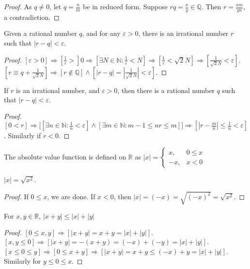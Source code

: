 \documentclass[crop=false,class=article,oneside]{standalone}
\begin{document}
    \begin{proof}
    As $q\ne 0$, let $q = \frac{n}{m}$ be in reduced form. Suppose $rq = \frac{x}{y}\in \mathbb{Q}$. Then $r=\frac{xm}{yn}$, a contradiction.
    \end{proof}
    \begin{theorem}
    Given a rational number $q$, and for any $\varepsilon>0$, there is an irrational number $r$ such that $|r-q|<\varepsilon$.
    \end{theorem}
    \begin{proof}
    $[\varepsilon>0]\Rightarrow [\frac{1}{\varepsilon}>]0\Rightarrow [\exists N\in \mathbb{N}:\frac{1}{\varepsilon}<N]\Rightarrow [\frac{1}{\varepsilon} < \sqrt{2}N]\Rightarrow [\frac{1}{\sqrt{2}N}< \varepsilon]$. $[r \equiv q+\frac{1}{\sqrt{2}{N}}]\Rightarrow [r\notin \mathbb{Q}]\land [|r-q| = |\frac{1}{\sqrt{2}N}| < \varepsilon]$.
    \end{proof}
    \begin{theorem}
    If $r$ is an irrational number, and $\varepsilon>0$, then there is a rational number $q$ such that $|r-q|<\varepsilon$.
    \end{theorem}
    \begin{proof}
    $[0<r]\Rightarrow \big[[\exists n\in \mathbb{N}: \frac{1}{n} < \varepsilon]\land[\exists m\in \mathbb{N}: m-1\leq nr \leq m]\big]\Rightarrow[|r-\frac{m}{n}| \leq \frac{1}{n} < \varepsilon]$. Similarly if $r<0$.
    \end{proof}
    \begin{definition}
    The absolute value function is defined on $\mathbb{R}$ as $|x| = \begin{cases} x, & 0 \leq x \\ -x, & x<0 \end{cases}$
    \end{definition}
    \begin{theorem}
    $|x| = \sqrt{x^2}$.
    \end{theorem}
    \begin{proof}
    If $0 \leq x$, we are done. If $x<0$, then $|x| = (-x) = \sqrt{(-x)^2} = \sqrt{x^2}$.
    \end{proof}
    \begin{theorem}
    For $x,y \in \mathbb{R}$, $|x+y|\leq |x|+|y|$
    \end{theorem}
    \begin{proof}
    $[0\leq x,y]\Rightarrow [|x+y| = x+y = |x|+|y|]$. $[x,y\leq 0]\Rightarrow [|x+y| = -(x+y) = (-x)+(-y)=|x|+|y|]$. $[x\leq 0 \leq y]\Rightarrow [0\leq x+y]\Rightarrow [|x+y| = x+y \leq (-x)+y=|x|+|y|]$. Similarly for $y\leq 0 \leq x$.
    \end{proof}
\end{document}
